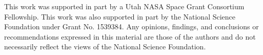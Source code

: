 \documentclass[journal abbreviation, manuscript]{copernicus}
\begin{document}
	\appendixtables   %
	
	
	
	
	
	
	
	\begin{acknowledgements}
		This work was supported in part by a Utah NASA Space Grant Consortium Fellowship. This work was also supported in part by the National Science Foundation under Grant No. 1539384. Any opinions, findings, and conclusions or recommendations expressed in this material are those of the authors and do not necessarily reflect the views of the National Science Foundation.
	\end{acknowledgements}
	
	
	
	
	
	
%		
%		
%		
	
	 
	 
	
	
	
\end{document}
